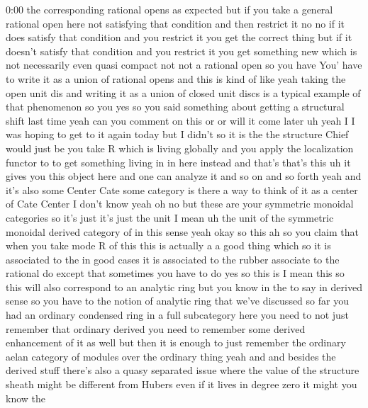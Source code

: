 \begin{unfinished}{0:00}
the  corresponding  rational  opens  as
expected  but  if  you  take  a  general
rational  open  here  not  satisfying  that
condition  and  then  restrict  it  no  no  if
it  does  satisfy  that  condition  and  you
restrict  it  you  get  the  correct  thing
but  if  it  doesn't  satisfy  that  condition
and  you  restrict  it  you  get  something
new  which  is  not  necessarily  even  quasi
compact  not  not  a  rational  open  so  you
have  You'  have  to  write  it  as  a  union  of
rational  opens  and  this  is  kind  of  like
yeah  taking  the  open  unit  dis  and
writing  it  as  a  union  of  closed  unit
discs  is  a  typical  example  of  that
phenomenon
so  you  yes  so  you  said  something  about
getting  a  structural  shift  last  time
yeah  can  you  comment  on  this  or  or  will
it  come  later  uh  yeah  I  I  was  hoping  to
get  to  it  again  today  but  I  didn't  so  it
is  the  the  structure  Chief  would  just  be
you  take  R  which  is  living  globally  and
you  apply  the  localization  functor  to  to
get  something  living  in  in  here  instead
and  that's  that's  this  uh  it  gives  you
this  object  here  and  one  can  analyze  it
and  so  on  and  so  forth  yeah  and  it's
also  some  Center  Cate  some  category  is
there  a  way  to  think  of  it  as  a  center
of  Cate  Center  I  don't  know  yeah  oh  no
but  these  are  your  symmetric  monoidal
categories  so  it's  just  it's  just  the
unit  I  mean  uh  the  unit  of  the  symmetric
monoidal  derived  category  of  in  this
sense  yeah  okay  so
this  ah  so  you  claim  that  when  you  take
mode  R  of  this  this  is
actually
a  a  good  thing  which  so  it  is  associated
to  the  in  good  cases  it  is  associated  to
the  rubber  associate  to  the  rational  do
except  that  sometimes  you  have  to  do  yes
so  this  is  I  mean  this  so  this  will  also
correspond  to  an  analytic  ring  but  you
know  in  the  to  say  in  derived  sense  so
you  have  to  the  notion  of  analytic  ring
that  we've  discussed  so  far  you  had  an
ordinary  condensed  ring  in  a  full
subcategory  here  you  need  to  not  just
remember
that  ordinary  derived  you  need  to
remember  some  derived  enhancement  of  it
as  well  but  then  it  is  enough  to  just
remember  the  ordinary  aelan  category  of
modules  over  the  ordinary  thing  yeah  and
and  besides  the  derived  stuff  there's
also  a  quasy  separated  issue  where  the
value  of  the  structure  sheath  might  be
different  from  Hubers  even  if  it  lives
in  degree  zero  it  might  you  know  the

\end{unfinished}
